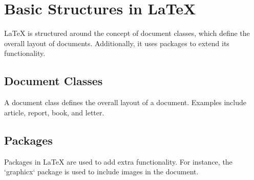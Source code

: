 \chapter{Basic Structures in LaTeX}
\label{chap:basic-structures}

LaTeX is structured around the concept of document classes, which define the overall layout of documents. Additionally, it uses packages to extend its functionality.

\section{Document Classes}
A document class defines the overall layout of a document. Examples include article, report, book, and letter.

\section{Packages}
Packages in LaTeX are used to add extra functionality. For instance, the `graphicx` package is used to include images in the document.

